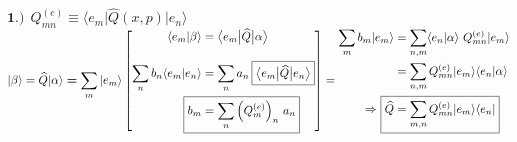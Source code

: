 \documentclass[12pt]{article}
\newcommand{\hs}{\hspace{1pt}} %
\begin{document}
\vspace{20pt}\noindent 
\(\boldsymbol{1.)} \ \ \boxed{ Q_{mn}^{(e)} \equiv 
    \big\langle e_m \big| \widehat{Q}{\scriptstyle(x,p)} \big| e_n \big\rangle }\) \\[5pt]
\( \displaystyle 
    | \beta \rangle = \widehat{Q} | \alpha \rangle \boldsymbol{=} \sum_m | e_m \rangle
    \left[ \begin{aligned}
        \langle e_m | \beta \rangle 
            &= \big\langle e_m \big| \widehat{Q} \big| \alpha \big\rangle 
            \\[10pt]
        \sum_n b_n \langle e_m | e_n \rangle 
            &= \sum_n a_n \hs\hs \boxed{ \big\langle e_m \big| \widehat{Q} \big| e_n \big\rangle } 
            \\
        \Aboxed{ b_m &= \sum_n \Big( Q_m^{(e)} \Big)_n \ a_n }
    \end{aligned} \right]
    =
    \begin{aligned}
        \sum_m b_m | e_m \rangle 
            & = \sum_{n,m} \langle e_n | \alpha \rangle \ Q_{mn}^{(e)} | e_m \rangle 
            \\
        & = \sum_{n,m} Q_{mn}^{(e)} | e_m \rangle \langle e_n |\alpha \rangle 
            \\
        \Rightarrow \ \Aboxed{ \widehat{Q}
            & = \sum_{m,n} Q_{mn}^{(e)} | e_m \rangle \langle e_n | }     
    \end{aligned} 
\)
\end{document}
